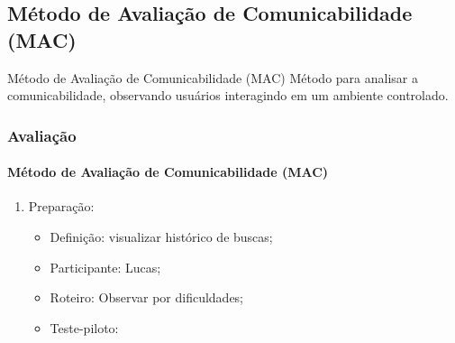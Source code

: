 \documentclass[14pt,beamer]{beamer}
\begin{document}
\subsection{Método de Avaliação de Comunicabilidade (MAC)}
\begin{frame}
    \begin{block}{Método de Avaliação de Comunicabilidade (MAC)}
        Método para analisar a comunicabilidade, observando usuários
        interagindo em um ambiente controlado.
    \end{block}
\end{frame}
\begin{frame}
	\frametitle{Avaliação}
	\framesubtitle{Método de Avaliação de Comunicabilidade (MAC)}

	\begin{enumerate}
        \item Preparação:
            \begin{itemize}
                \item Definição: visualizar histórico de buscas;
                \item Participante: Lucas;
                \item Roteiro: Observar por dificuldades;
                \item Teste-piloto: 
            \end{itemize}
	\end{enumerate}
    

\end{frame}
\end{document}
